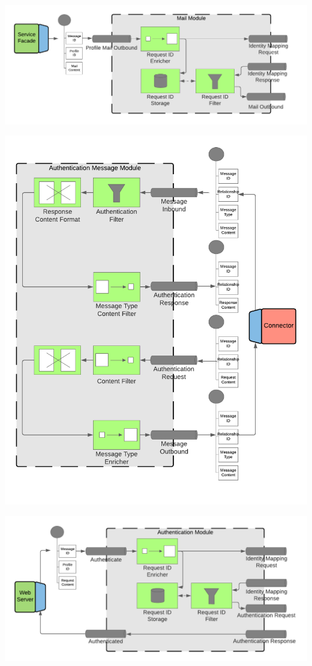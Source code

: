 \begin{center}
    \includegraphics[scale=0.6]{Diagrams/Integration Architecture 1/Technological Integration/13. Mail Module.pdf}
\end{center}

\begin{center}
    \includegraphics[scale=0.6]{Diagrams/Integration Architecture 1/Technological Integration/14. Authenticatin Message Module.pdf}
\end{center}

\begin{center}
    \includegraphics[scale=0.6]{Diagrams/Integration Architecture 1/Technological Integration/15. Authentication.pdf}
\end{center}